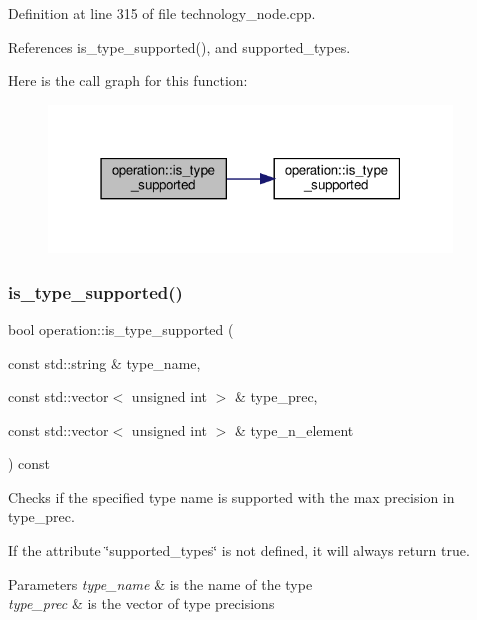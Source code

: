 Definition at line 315 of file technology\+\_\+node.\+cpp.



References is\+\_\+type\+\_\+supported(), and supported\+\_\+types.

Here is the call graph for this function\+:
\nopagebreak
\begin{figure}[H]
\begin{center}
\leavevmode
\includegraphics[width=304pt]{d9/dc0/structoperation_a34a78778569a0ff97520b3148ec21521_cgraph}
\end{center}
\end{figure}
\mbox{\label{structoperation_a2fbbfb27340dda2d4b29952781b32150}} 
\subsubsection{\texorpdfstring{is\+\_\+type\+\_\+supported()}{is\_type\_supported()}\hspace{0.1cm}{\footnotesize\ttfamily [3/3]}}
{\footnotesize\ttfamily bool operation\+::is\+\_\+type\+\_\+supported (\begin{DoxyParamCaption}\item[{const std\+::string \&}]{type\+\_\+name,  }\item[{const std\+::vector$<$ unsigned int $>$ \&}]{type\+\_\+prec,  }\item[{const std\+::vector$<$ unsigned int $>$ \&}]{type\+\_\+n\+\_\+element }\end{DoxyParamCaption}) const}



Checks if the specified type name is supported with the max precision in type\+\_\+prec. 

If the attribute \char`\"{}supported\+\_\+types\char`\"{} is not defined, it will always return true. 
\begin{DoxyParams}{Parameters}
{\em type\+\_\+name} & is the name of the type \\
\hline
{\em type\+\_\+prec} & is the vector of type precisions \\
\hline
\end{DoxyParams}


